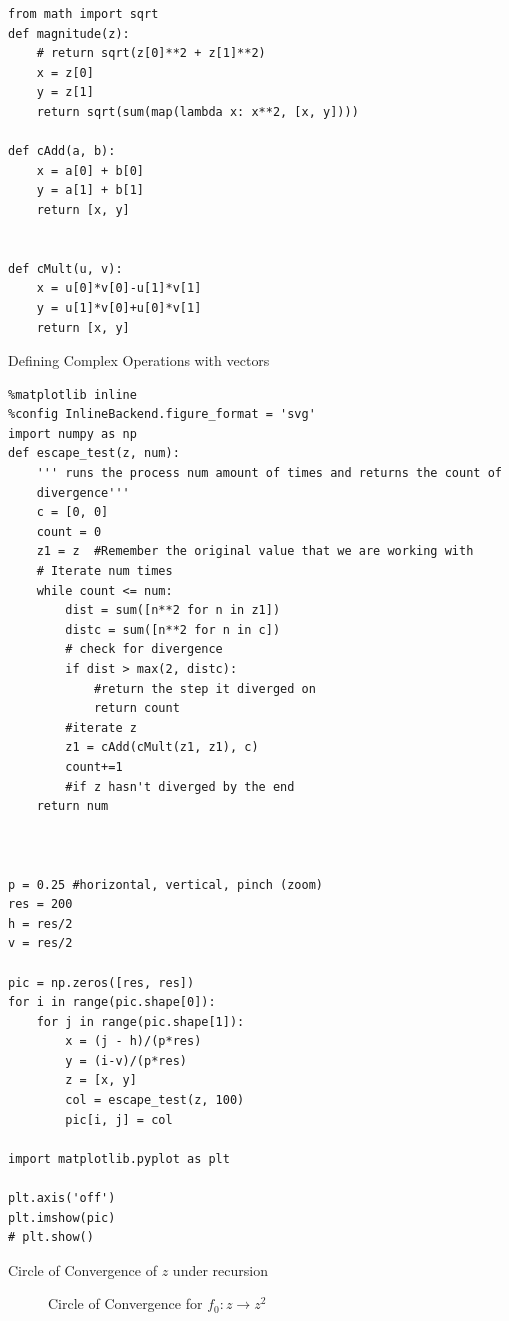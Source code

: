 \documentclass[a4paper,11pt,twoside]{article}
\begin{document}
\newpage
\begin{listing}[htbp]
\begin{verbatim}
from math import sqrt
def magnitude(z):
    # return sqrt(z[0]**2 + z[1]**2)
    x = z[0]
    y = z[1]
    return sqrt(sum(map(lambda x: x**2, [x, y])))

def cAdd(a, b):
    x = a[0] + b[0]
    y = a[1] + b[1]
    return [x, y]


def cMult(u, v):
    x = u[0]*v[0]-u[1]*v[1]
    y = u[1]*v[0]+u[0]*v[1]
    return [x, y]
\end{verbatim}
\caption{\label{complex-vec}Defining Complex Operations with vectors}
\end{listing}

\begin{listing}[htbp]
\begin{verbatim}
%matplotlib inline
%config InlineBackend.figure_format = 'svg'
import numpy as np
def escape_test(z, num):
    ''' runs the process num amount of times and returns the count of
    divergence'''
    c = [0, 0]
    count = 0
    z1 = z  #Remember the original value that we are working with
    # Iterate num times
    while count <= num:
        dist = sum([n**2 for n in z1])
        distc = sum([n**2 for n in c])
        # check for divergence
        if dist > max(2, distc):
            #return the step it diverged on
            return count
        #iterate z
        z1 = cAdd(cMult(z1, z1), c)
        count+=1
        #if z hasn't diverged by the end
    return num



p = 0.25 #horizontal, vertical, pinch (zoom)
res = 200
h = res/2
v = res/2

pic = np.zeros([res, res])
for i in range(pic.shape[0]):
    for j in range(pic.shape[1]):
        x = (j - h)/(p*res)
        y = (i-v)/(p*res)
        z = [x, y]
        col = escape_test(z, 100)
        pic[i, j] = col

import matplotlib.pyplot as plt

plt.axis('off')
plt.imshow(pic)
# plt.show()

\end{verbatim}
\caption{\label{py-circle-code}Circle of Convergence of \(z\) under recursion}
\end{listing}


\begin{figure}
\centering

\caption{\label{py-circle-plot}Circle of Convergence for \(f_{0}: z \rightarrow z^{2}\)}
\end{figure}
\end{document}
